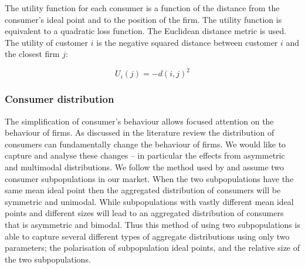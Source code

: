 \documentclass[preprint, 12pt]{elsarticle}
\begin{document}
The utility function for each consumer is a function of the distance from the consumer's ideal point and to the position of the firm. The utility function is equivalent to a quadratic loss function. The Euclidean distance metric is used. The utility of customer $i$ is the negative squared distance between customer $i$ and the closest firm $j$:

\begin{equation}
	U_i(j) = -d(i,j)^2
	\label{eq:utility}
\end{equation}

\subsubsection{Consumer distribution}

The simplification of consumer's behaviour allows focused attention on the behaviour of firms. As discussed in the literature review the distribution of consumers can fundamentally change the behaviour of firms. We would like to capture and analyse these changes -- in particular the effects from asymmetric and multimodal distributions. We follow the method used by \citet{Laver_Sergenti_2011} and assume two consumer subpopulations in our market. When the two subpopulations have the same mean ideal point then the aggregated distribution of consumers will be symmetric and unimodal. While subpopulations with vastly different mean ideal points and different sizes will lead to an aggregated distribution of consumers that is asymmetric and bimodal. Thus this method of using two subpopulations is able to capture several different types of aggregate distributions using only two parameters; the polarisation of subpopulation ideal points, and the relative size of the two subpopulations. 
\end{document}
